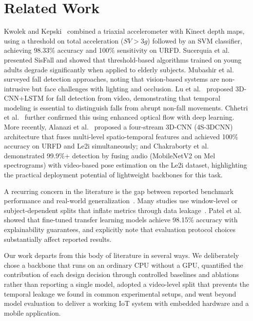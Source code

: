 \documentclass[runningheads]{llncs}
\begin{document}
\section{Related Work}

Kwolek and Kepski~\cite{kwolek2014} combined a triaxial accelerometer with Kinect depth maps, using a threshold on total acceleration ($SV > 3g$) followed by an SVM classifier, achieving 98.33\% accuracy and 100\% sensitivity on URFD. Sucerquia et al.~\cite{sisfall2017} presented SisFall and showed that threshold-based algorithms trained on young adults degrade significantly when applied to elderly subjects. Mubashir et al.~\cite{mubashir2013} surveyed fall detection approaches, noting that vision-based systems are non-intrusive but face challenges with lighting and occlusion. Lu et al.~\cite{lu2019} proposed 3D-CNN+LSTM for fall detection from video, demonstrating that temporal modeling is essential to distinguish falls from abrupt non-fall movements. Chhetri et al.~\cite{chhetri2021} further confirmed this using enhanced optical flow with deep learning. More recently, Alanazi et al.~\cite{alanazi2022} proposed a four-stream 3D-CNN (4S-3DCNN) architecture that fuses multi-level spatio-temporal features and achieved 100\% accuracy on URFD and Le2i simultaneously; and Chakraborty et al.~\cite{chakraborty2024} demonstrated 99.9\%+ detection by fusing audio (MobileNetV2 on Mel spectrograms) with video-based pose estimation on the Le2i dataset, highlighting the practical deployment potential of lightweight backbones for this task.

A recurring concern in the literature is the gap between reported benchmark performance and real-world generalization~\cite{thakkar2024}. Many studies use window-level or subject-dependent splits that inflate metrics through data leakage~\cite{lu2019,chhetri2021}. Patel et al.~\cite{patel2024} showed that fine-tuned transfer learning models achieve 98.15\% accuracy with explainability guarantees, and explicitly note that evaluation protocol choices substantially affect reported results.

Our work departs from this body of literature in several ways. We deliberately chose a backbone that runs on an ordinary CPU without a GPU, quantified the contribution of each design decision through controlled baselines and ablations rather than reporting a single model, adopted a video-level split that prevents the temporal leakage we found in common experimental setups, and went beyond model evaluation to deliver a working IoT system with embedded hardware and a mobile application.
\end{document}
